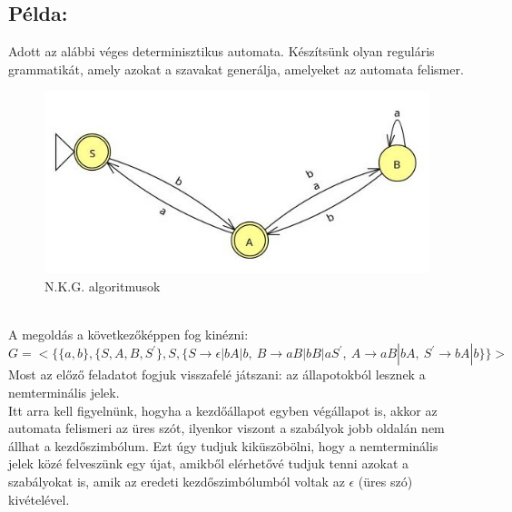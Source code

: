 \documentclass[12pt]{article}
\begin{document}
\subsection{Példa:}
Adott az alábbi véges determinisztikus automata. Készítsünk olyan reguláris grammatikát, amely azokat a szavakat
generálja, amelyeket az automata felismer.
\begin{figure}[h]
  \centering
  \includegraphics[width=0.7\linewidth]{img/a_to_g.jpg} 
  \caption{N.K.G. algoritmusok}
  \label{fig:your_label}
\end{figure}\\
A megoldás a következőképpen fog kinézni:
$$ G=<\{ \{a,b\}, \{S,A,B,S^{'} \}, S,
\{ S \rightarrow \epsilon|bA|b, \ B \rightarrow aB|bB|aS^{'}, \ A \rightarrow aB|bA, \ S^{'} \rightarrow bA|b \} 
\}> $$
Most az előző feladatot fogjuk visszafelé játszani: az állapotokból lesznek a nemterminális jelek.
\\
Itt arra kell figyelnünk, hogyha a kezdőállapot egyben végállapot is, akkor az automata felismeri az üres szót,
ilyenkor viszont a szabályok jobb oldalán nem állhat a kezdőszimbólum. Ezt úgy tudjuk kiküszöbölni, hogy
a nemterminális jelek közé felveszünk egy újat, amikből elérhetővé tudjuk tenni azokat a szabályokat is, amik
az eredeti kezdőszimbólumból voltak az $\epsilon$ (üres szó) kivételével.
\end{document}
